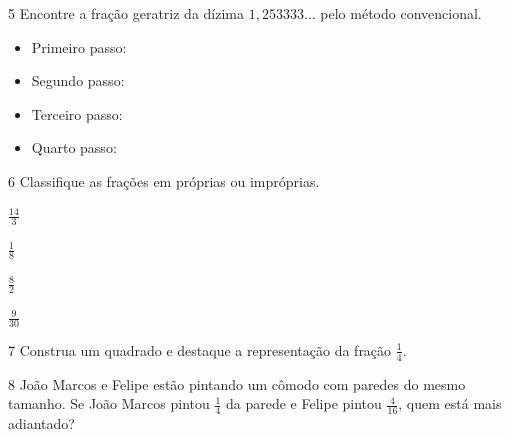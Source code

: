 

\num{5} Encontre a fração geratriz da dízima $1,253333\ldots{}$ pelo método
convencional.

\begin{itemize}[itemsep=-7mm]
\item \parbox{16ex}{Primeiro passo:} 
\item \parbox{16ex}{Segundo passo:}  
\item \parbox{16ex}{Terceiro passo:} 
\item \parbox{16ex}{Quarto passo:}   
\end{itemize}

\pagebreak
\num{6} Classifique as frações em próprias ou impróprias.

\begin{multicols}{2}
\begin{escolha}[itemsep=0pt]
    \item $\frac{14}{3}$ 
    \item$\frac{1}{8}$ 
    \item $\frac{8}{2}$ 
    \item $\frac{9}{30}$ 
\end{escolha}
\end{multicols}

\num{7} Construa um quadrado e destaque a representação da fração
$\frac{1}{4}$.

\medskip
{} 
\medskip

\num{8} João Marcos e Felipe estão pintando um cômodo com paredes do mesmo
tamanho. Se João Marcos pintou $\frac{1}{4}$ da parede e Felipe pintou
$\frac{4}{16}$, quem está mais adiantado?


